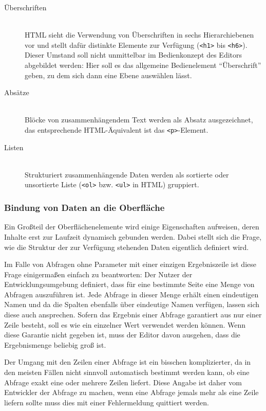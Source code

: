 \begin{description}
  \item[Überschriften] \hfill \\
    HTML sieht die Verwendung von Überschriften in sechs Hierarchiebenen vor und stellt dafür distinkte Elemente zur Verfügung (\texttt{<h1>} bis \texttt{<h6>}). Dieser Umstand soll nicht unmittelbar im Bedienkonzept des Editors abgebildet werden: Hier soll es das allgemeine Bedienelement ``Überschrift'' geben, zu dem sich dann eine Ebene auswählen lässt.
  \item[Absätze] \hfill \\
    Blöcke von zusammenhängendem Text werden als Absatz ausgezeichnet, das entsprechende HTML-Äquivalent ist das \texttt{<p>}-Element.
  \item[Listen] \hfill \\
    Strukturiert zusammenhängende Daten werden als sortierte oder unsortierte Liste (\texttt{<ol>} bzw. \texttt{<ul>} in HTML) gruppiert.
      
\end{description}

\subsubsection{Bindung von Daten an die Oberfläche}

Ein Großteil der Oberflächenelemente wird einige Eigenschaften aufweisen, deren Inhalte erst zur Laufzeit dynamisch gebunden werden. Dabei stellt sich die Frage, wie die Struktur der zur Verfügung stehenden Daten eigentlich definiert wird.

Im Falle von Abfragen ohne Parameter mit einer einzigen Ergebniszeile ist diese Frage einigermaßen einfach zu beantworten: Der Nutzer der Entwicklungsumgebung definiert, dass für eine bestimmte Seite eine Menge von Abfragen auszuführen ist. Jede Abfrage in dieser Menge erhält einen eindeutigen Namen und da die Spalten ebenfalls über eindeutige Namen verfügen, lassen sich diese auch ansprechen. Sofern das Ergebnis einer Abfrage garantiert aus nur einer Zeile besteht, soll es wie ein einzelner Wert verwendet werden können. Wenn diese Garantie nicht gegeben ist, muss der Editor davon ausgehen, dass die Ergebnismenge beliebig groß ist.

Der Umgang mit den Zeilen einer Abfrage ist ein bisschen komplizierter, da in den meisten Fällen nicht sinnvoll automatisch bestimmt werden kann, ob eine Abfrage exakt eine oder mehrere Zeilen liefert. Diese Angabe ist daher vom Entwickler der Abfrage zu machen, wenn eine Abfrage jemals mehr als eine Zeile liefern sollte muss dies mit einer Fehlermeldung quittiert werden.

